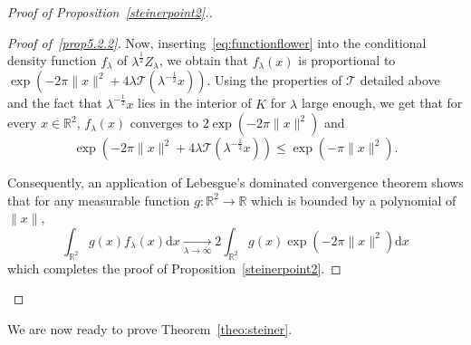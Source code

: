 \documentclass[10pt]{amsart}
\theoremstyle{definition}\newtheorem{defi}[theo]{Definition}\newtheorem{rema}[theo]{Remark}\newtheorem{exam}[theo]{Example}\newtheorem{exem}[theo]{Example}\newtheorem{nota}[theo]{Notation}
\newcommand{\cT}{\mathcal{T}}
\newcommand{\dd}{\mathrm{d}}
\newcommand{\R}{\mathbb{R}}
\newcommand{\pass}{\vspace{0.3cm}\noindent}
\newcommand{\noi}{\noindent}
\newenvironment*{lastprooff}{\begin{proof}}{\end{proof}}
\begin{document}
\begin{proof}[{Proof of Proposition~\ref{steinerpoint2}.}]
\begin{lastprooff}[{Proof of~\eqref{prop5.2.2}}]
Now, inserting~\eqref{eq:functionflower} into the conditional density function $f_{\lambda}$ of $\lambda^{\frac12}Z_\lambda$, we obtain that $f_{\lambda}(x)$ is proportional to $\exp(-2\pi\|x\|^2+4\lambda{\cT}(\lambda^{-\frac12}x))$. Using the properties of $\cT$ detailed above and the fact that $\lambda^{-\frac{1}{2}}x$ lies in the interior of $K$ for $\lambda$ large enough, we get that for every $x\in\R^2$, $f_\lambda(x)$ converges to $2\exp(-2\pi\|x\|^2)$ and
\begin{equation*}
\exp\left(-2\pi\|x\|^2+4\lambda{\cT}\left(\lambda^{-\frac12}x\right)\right)\le \exp\left(-\pi\|x\|^2\right).
\end{equation*}

Consequently, an application of Lebesgue's dominated convergence theorem shows that for any measurable function $g:\R^2\longrightarrow \R$ which is bounded by a polynomial of~$\|x\|$,
\begin{equation*}
\int_{\R^2} g(x)f_\lambda(x)\dd x \underset{\lambda\to\infty}{\longrightarrow} 2\int_{\R^2} g(x)\exp(-2\pi\|x\|^2)\dd x
\end{equation*}
which completes the proof of Proposition~\ref{steinerpoint2}.
\end{lastprooff}\let\qed\relax
\end{proof}

We are now ready to prove Theorem~\ref{theo:steiner}.
\end{document}
